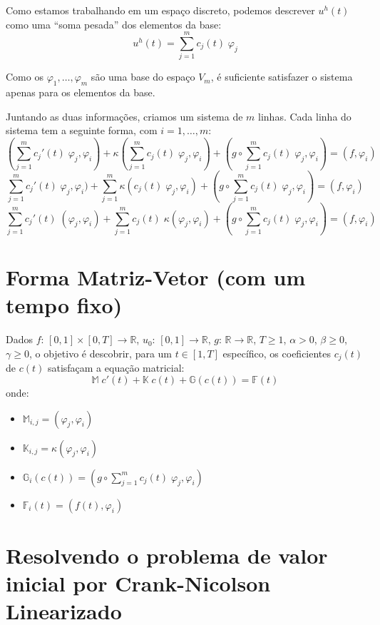 \documentclass[a4paper]{article}
\newcommand{\typ}{:\,}
\newcommand{\vphi}{\varphi}
\begin{document}
Como estamos trabalhando em um espaço discreto,
podemos descrever \(u^h(t)\)
como uma ``soma pesada'' dos elementos da base:
\[
    u^h(t) = \sum_{j=1}^m{ c_j(t) \; \vphi_j }
\]

Como os \(\vphi_1, \dots, \vphi_m\)
são uma base do espaço \(V_m\),
é suficiente satisfazer o sistema
apenas para os elementos da base.

Juntando as duas informações,
criamos um sistema de \(m\) linhas.
Cada linha do sistema tem a seguinte forma,
com \(i = 1, \dots, m\):
\[
    (\sum_{j=1}^m{ {c_j}'(t) \; \vphi_j }, \vphi_i)
    + \kappa(\sum_{j=1}^m{ {c_j}(t) \; \vphi_j }, \vphi_i)
    + (g \circ \sum_{j=1}^m{ {c_j}(t) \; \vphi_j }, \vphi_i)
    = (f, \vphi_i)
\] \[
    \sum_{j=1}^m{ {c_j}'(t) \; \vphi_j, \vphi_i) }
    + \sum_{j=1}^m{ \kappa({c_j}(t) \; \vphi_j, \vphi_i) }
    + (g \circ \sum_{j=1}^m{ {c_j}(t) \; \vphi_j }, \vphi_i)
    = (f, \vphi_i)
\] \[
    \sum_{j=1}^m{ {c_j}'(t) \; (\vphi_j, \vphi_i) }
    + \sum_{j=1}^m{ {c_j}(t) \; \kappa(\vphi_j, \vphi_i) }
    + (g \circ \sum_{j=1}^m{ {c_j}(t) \; \vphi_j }, \vphi_i)
    = (f, \vphi_i)
\]

\section{Forma Matriz-Vetor (com um tempo fixo)}

Dados
\(f \typ [0, 1] \times [0, T] \to \mathbb{R}\),
\(u_0 \typ [0, 1] \to \mathbb{R}\),
\(g \typ \mathbb{R} \to \mathbb{R}\),
\(T \ge 1\),
\(\alpha > 0\),
\(\beta \ge 0\),
\(\gamma \ge 0\),
o objetivo é descobrir,
para um \(t \in [1, T]\) específico,
os coeficientes \(c_j(t)\)
de \(c(t)\)
satisfaçam a equação matricial:
\[
    \mathbb{M} \; c'(t) + \mathbb{K} \; c(t) + \mathbb{G}(c(t)) = \mathbb{F}(t)
\]
onde:
\begin{itemize}
\item \(
    \mathbb{M}_{i, j} = (\vphi_j, \vphi_i)
\)
\item \(
    \mathbb{K}_{i, j} = \kappa(\vphi_j, \vphi_i)
\)
\item \(
    \mathbb{G}_{i}(c(t)) = (g \circ \sum_{j=1}^m{ c_j(t) \; \vphi_j }, \vphi_i)
\)
\item \(
    \mathbb{F}_i(t) = (f(t), \vphi_i)
\)
\end{itemize}

\section{Resolvendo o problema de valor inicial por Crank-Nicolson Linearizado}
\end{document}
